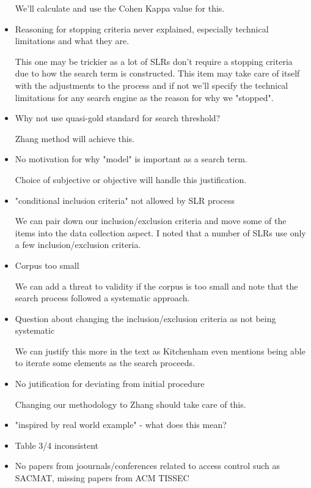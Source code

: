 \begin{itemize}
We'll calculate and use the Cohen Kappa value for this.

\item Reasoning for stopping criteria never explained, especially technical limitations and what they are.

This one may be trickier as a lot of SLRs don't require a stopping criteria due to how the search term is constructed.
This item may take care of itself with the adjustments to the process and if not we'll specify the technical limitations for any search engine as the reason for why we "stopped".

\item Why not use quasi-gold standard for search threshold?

Zhang method will achieve this.

\item No motivation for why "model" is important as a search term.

Choice of subjective or objective will handle this justification.

\item "conditional inclusion criteria" not allowed by SLR process

We can pair down our inclusion/exclusion criteria and move some of the items into the data collection aspect.
I noted that a number of SLRs use only a few inclusion/exclusion criteria.

\item Corpus too small

We can add a threat to validity if the corpus is too small and note that the search process followed a systematic approach.

\item Question about changing the inclusion/exclusion criteria as not being systematic

We can justify this more in the text as Kitchenham even mentions being able to iterate some elements as the search proceeds.

\item No jutification for deviating from initial procedure

Changing our methodology to Zhang should take care of this.

\item "inspired by real world example" - what does this mean?

\item Table 3/4 inconsistent

\item No papers from joournals/conferences related to access control such as SACMAT, missing papers from ACM TISSEC


\end{itemize}
